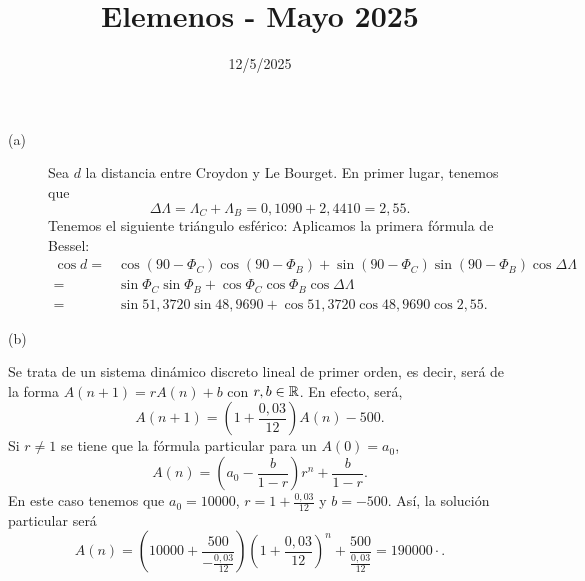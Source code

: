 \documentclass{article}
\begin{document}
\title{Elemenos - Mayo 2025}
\date{12/5/2025}

\maketitle

\begin{sol}
\begin{description}
\item[(a)] Sea $\displaystyle d $ la distancia entre Croydon y Le Bourget. En primer lugar, tenemos que 
	\[\Delta \Lambda = \Lambda _{C} + \Lambda_{B} = 0,1090 + 2,4410 = 2,55 .\]
	Tenemos el siguiente triángulo esférico: Aplicamos la primera fórmula de Bessel:
	\[
	\begin{split}
		\cos d = & \cos \left(90 - \Phi_{C}\right)\cos \left(90-\Phi_{B}\right) + \sin\left(90-\Phi_{C}\right)\sin\left(90-\Phi_{B}\right)\cos\Delta\Lambda \\
		= & \sin\Phi_{C}\sin\Phi_{B} + \cos \Phi_{C}\cos\Phi_{B}\cos\Delta\Lambda \\
		= & \sin51,3720\sin48,9690 + \cos 51,3720 \cos 48,9690 \cos 2,55.
	\end{split}
	\]
\item[(b)] 
\end{description}

\end{sol}

\begin{sol}
Se trata de un sistema dinámico discreto lineal de primer orden, es decir, será de la forma $\displaystyle A\left(n+1\right) = rA\left(n\right) + b$ con $\displaystyle r,b \in \mathbb{R} $. En efecto, será,
\[A\left(n+1\right) = \left(1+\frac{0,03}{12}\right)A\left(n\right) - 500 .\]
Si $\displaystyle r \neq 1 $ se tiene que la fórmula particular para un $\displaystyle A\left(0\right) = a_{0} $,
\[A\left(n\right) = \left(a_{0}-\frac{b}{1-r}\right)r^{n}+\frac{b}{1-r} .\]
En este caso tenemos que $\displaystyle a_{0}= 10000 $, $\displaystyle r = 1 + \frac{0,03}{12}$ y $\displaystyle b = - 500 $. Así, la solución particular será
\[A\left(n\right) = \left(10000 + \frac{500}{-\frac{0,03}{12}}\right)\left(1+\frac{0,03}{12}\right)^{n}+\frac{500}{\frac{0,03}{12}} = 190000 \cdot  .\]

\end{sol}
\end{document}
